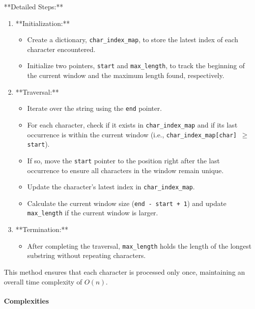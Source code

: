 **Detailed Steps:**
\begin{enumerate}
    \item **Initialization:**
    \begin{itemize}
        \item Create a dictionary, \texttt{char\_index\_map}, to store the latest index of each character encountered.
        \item Initialize two pointers, \texttt{start} and \texttt{max\_length}, to track the beginning of the current window and the maximum length found, respectively.
    \end{itemize}
    
    \item **Traversal:**
    \begin{itemize}
        \item Iterate over the string using the \texttt{end} pointer.
        \item For each character, check if it exists in \texttt{char\_index\_map} and if its last occurrence is within the current window (i.e., \texttt{char\_index\_map[char] \(\geq\) start}).
        \item If so, move the \texttt{start} pointer to the position right after the last occurrence to ensure all characters in the window remain unique.
        \item Update the character's latest index in \texttt{char\_index\_map}.
        \item Calculate the current window size (\texttt{end - start + 1}) and update \texttt{max\_length} if the current window is larger.
    \end{itemize}
    
    \item **Termination:**
    \begin{itemize}
        \item After completing the traversal, \texttt{max\_length} holds the length of the longest substring without repeating characters.
    \end{itemize}
\end{enumerate}

This method ensures that each character is processed only once, maintaining an overall time complexity of \(O(n)\).

\paragraph*{Complexities}

